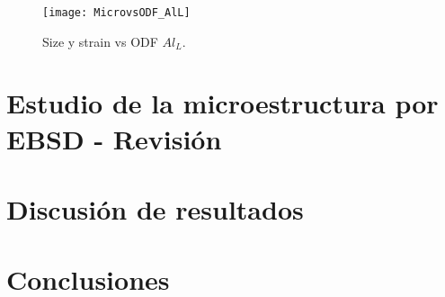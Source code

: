 \begin{figure}[!htb]
  \centering
  \texttt{[image: MicrovsODF\_AlL]}
  \caption{Size y strain vs ODF $Al_L$.}
  \label{fig:AlLMicro}
\end{figure}

\newpage
\section{Estudio de la microestructura por EBSD - Revisión}\label{S:AlEBSD}
\section{Discusión de resultados}\label{S:AlDis}
\section{Conclusiones}\label{S:AlConclusiones}
